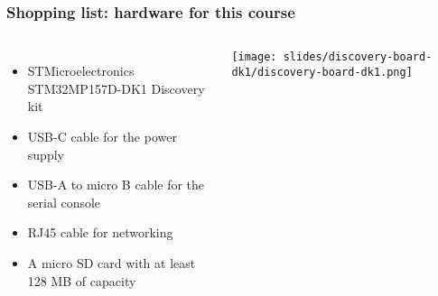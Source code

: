 \begin{frame}
\frametitle{Shopping list: hardware for this course}
  \begin{columns}
    \footnotesize
    \begin{itemize}
      \item STMicroelectronics STM32MP157D-DK1 Discovery kit
      \item USB-C cable for the power supply
      \item USB-A to micro B cable for the serial console
      \item RJ45 cable for networking
      \item A micro SD card with at least 128 MB of capacity
    \end{itemize}
    \vspace{1cm}
    \texttt{[image: slides/discovery-board-dk1/discovery-board-dk1.png]}
  \end{columns}
\end{frame}
